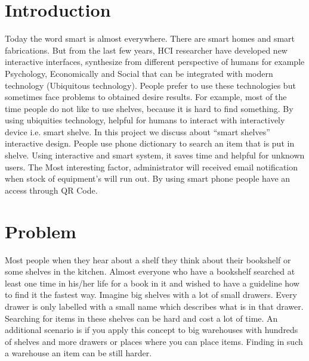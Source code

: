 \documentclass{sigchi}
\begin{document}
\section{Introduction}
Today the word smart is almost everywhere. There are smart homes and smart
fabrications. But from the last few years, HCI researcher have developed new
interactive interfaces, synthesize from different perspective of humans for example
Psychology, Economically and Social that can be integrated with modern
technology (Ubiquitous technology). People prefer to use these technologies but
sometimes face problems to obtained desire results. For example, most of the time
people do not like to use shelves, because it is hard to find something. By using
ubiquities technology, helpful for humans to interact with interactively device i.e.
smart shelve. In this project we discuss about ``smart shelves'' interactive design.
People use phone dictionary to search an item that is put in shelve. Using
interactive and smart system, it saves time and helpful for unknown users. The
Most interesting factor, administrator will received email notification when stock
of equipment's will run out. By using smart phone people have an access through
QR Code. 


\section{Problem}
Most people when they hear about a shelf they think about their bookshelf or some shelves in the kitchen. 
Almost everyone who have a bookshelf searched at least one time in his/her life for a book in it and wished to have a guideline how to find it the fastest way. 
Imagine big shelves with a lot of small drawers. 
Every drawer is only labelled with a small name which describes what is in that drawer. 
Searching for items in these shelves can be hard and cost a lot of time. 
An additional scenario is if you apply this concept to big warehouses with hundreds of shelves and more drawers or places where you can place items. 
Finding in such a warehouse an item can be still harder. 
\end{document}
